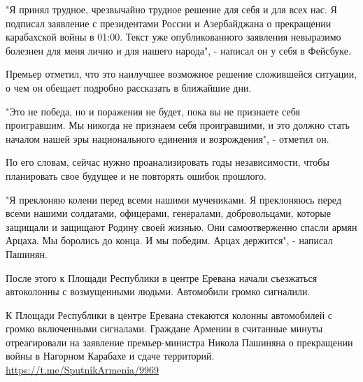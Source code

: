 "Я принял трудное, чрезвычайно трудное решение для себя и для всех нас. Я
подписал заявление с президентами России и Азербайджана о прекращении
карабахской войны в 01:00. Текст уже опубликованного заявления невыразимо
болезнен для меня лично и для нашего народа", - написал он у себя в Фейсбуке.

Премьер отметил, что это наилучшее возможное решение сложившейся ситуации, о
чем он обещает подробно рассказать в ближайшие дни.

"Это не победа, но и поражения не будет, пока вы не признаете себя проигравшим.
Мы никогда не признаем себя проигравшими, и это должно стать началом нашей эры
национального единения и возрождения", - отметил он.

По его словам, сейчас нужно проанализировать годы независимости, чтобы
планировать свое будущее и не повторять ошибок прошлого.

"Я преклоняю колени перед всеми нашими мучениками. Я преклоняюсь перед всеми
нашими солдатами, офицерами, генералами, добровольцами, которые защищали и
защищают Родину своей жизнью. Они самоотверженно спасли армян Арцаха. Мы
боролись до конца. И мы победим. Арцах держится", - написал Пашинян.

После этого к Площади Республики в центре Еревана начали съезжаться автоколонны
с возмущенными людьми. Автомобили громко сигналили. 

\begin{center}
	\begin{fminipage}{0.7\textwidth} 
		К Площади Республики в центре Еревана
		стекаются колонны автомобилей с громко включенными сигналами.
		Граждане Армении в считанные минуты отреагировали на заявление
		премьер-министра Никола Пашиняна о прекращении войны в Нагорном
		Карабахе и сдаче территорий.
		\url{https://t.me/SputnikArmenia/9969}
  \end{fminipage}
\end{center}


  
